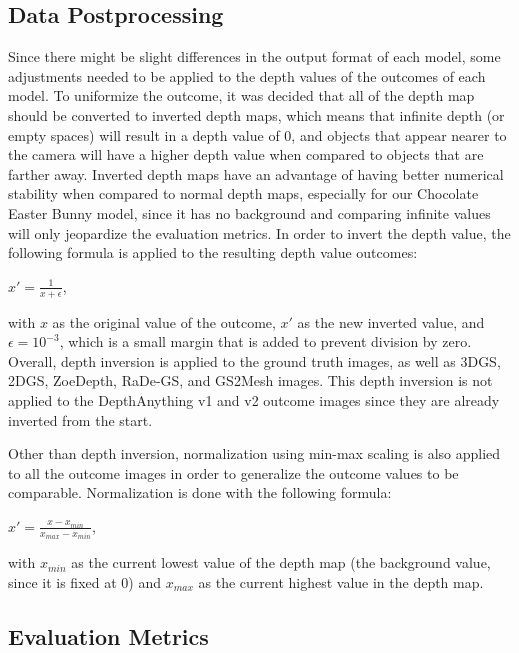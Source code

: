 \subsection{Data Postprocessing}

Since there might be slight differences in the output format of each model, some adjustments needed to be applied to the depth values of the outcomes of each model. To uniformize the outcome, it was decided that all of the depth map should be converted to inverted depth maps, which means that infinite depth (or empty spaces) will result in a depth value of 0, and objects that appear nearer to the camera will have a higher depth value when compared to objects that are farther away. Inverted depth maps have an advantage of having better numerical stability when compared to normal depth maps, especially for our Chocolate Easter Bunny model, since it has no background and comparing infinite values will only jeopardize the evaluation metrics. In order to invert the depth value, the following formula is applied to the resulting depth value outcomes:

\begin{center}
    \(x' = \frac{1}{x + \epsilon}\),
\end{center}
with \(x\) as the original value of the outcome, \(x'\) as the new inverted value, and \(\epsilon = 10^{-3}\), which is a small margin that is added to prevent division by zero. Overall, depth inversion is applied to the ground truth images, as well as 3DGS, 2DGS, ZoeDepth, RaDe-GS, and GS2Mesh images. This depth inversion is not applied to the DepthAnything v1 and v2 outcome images since they are already inverted from the start. 

Other than depth inversion, normalization using min-max scaling is also applied to all the outcome images in order to generalize the outcome values to be comparable. Normalization is done with the following formula:

\begin{center}
    \(x' = \frac{x - x_{min}}{x_{max} - x_{min}}\),
\end{center}
with \(x_{min}\) as the current lowest value of the depth map (the background value, since it is fixed at 0) and \(x_{max}\) as the current highest value in the depth map.

\subsection{Evaluation Metrics}

